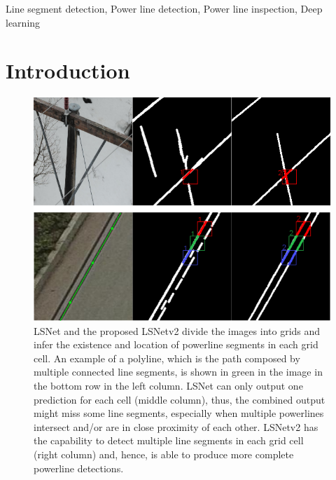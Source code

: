 \documentclass[journal]{IEEEtran}
\begin{document}
\begin{IEEEkeywords}
Line segment detection, Power line detection, Power line inspection, Deep learning
\end{IEEEkeywords}






%
\IEEEpeerreviewmaketitle

\section{Introduction}

\begin{figure}[hbt!]
  \includegraphics[width=\linewidth]{imgs/others/first.png}
  \caption{LSNet and the proposed LSNetv2 divide the images into grids and infer the existence and location of powerline segments in each grid cell. An example of a polyline, which is the path composed by multiple connected line segments, is shown in green in the image in the bottom row in the left column. LSNet can only output one prediction for each cell (middle column), thus, the combined output might miss some line segments, especially when multiple powerlines intersect and/or are in close proximity of each other. LSNetv2 has the capability to detect multiple line segments in each grid cell (right column) and, hence, is able to produce more complete powerline detections.}
  \label{first_examples}
\end{figure}
\end{document}
